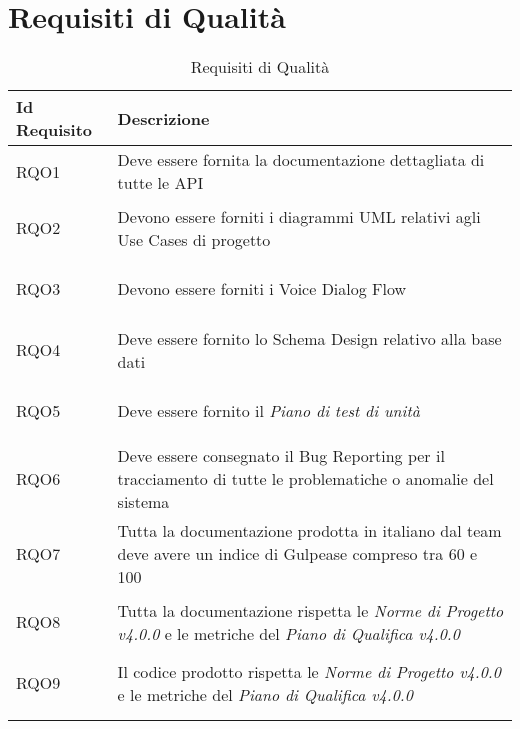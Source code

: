 \section{Requisiti di Qualità}
\normalsize
\begin{longtable}{|>{\centering}m{5em}|m{25em}|}
	\hline
	\textbf{Id Requisito} & \textbf{Descrizione}\\
	\hline
	\endhead
	\hypertarget{RQO1}{RQO1} & Deve essere fornita la documentazione dettagliata di tutte le API\\ \hline
	
	\hypertarget{RQO2}{RQO2} & Devono essere forniti i diagrammi UML relativi agli Use Cases di progetto\\ \hline
	
	\hypertarget{RQO3}{RQO3} & Devono essere forniti i Voice Dialog Flow\\ \hline
	
	\hypertarget{RQO4}{RQO4} & Deve essere fornito lo Schema Design relativo alla base dati\\ \hline
	
	\hypertarget{RQO5}{RQO5} & Deve essere fornito il \textit{Piano di test di unità}\\ \hline
	
	\hypertarget{RQO6}{RQO6} & Deve essere consegnato il Bug Reporting per il tracciamento di tutte le problematiche o anomalie del sistema\\ \hline
	
	\hypertarget{RQO7}{RQO7} & Tutta la documentazione prodotta in italiano dal team deve avere un indice di Gulpease compreso tra 60 e 100\\ \hline
	
	\hypertarget{RQO8}{RQO8} & Tutta la documentazione rispetta le \textit{Norme di Progetto v4.0.0} e le metriche del \textit{Piano di Qualifica v4.0.0}\\ \hline
	
	\hypertarget{RQO9}{RQO9} & Il codice prodotto rispetta le \textit{Norme di Progetto v4.0.0} e le metriche del \textit{Piano di Qualifica v4.0.0}\\ \hline
	
	\caption[Requisiti di Qualità]{Requisiti di Qualità}
	\label{tabella:req2}
\end{longtable}
\clearpage
